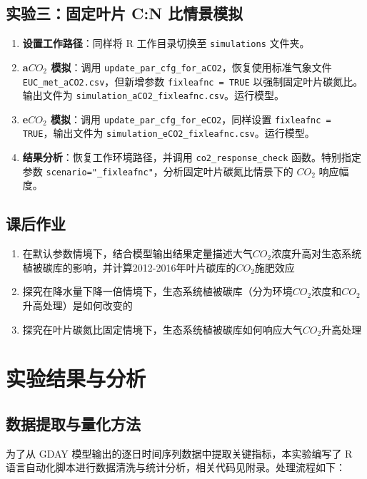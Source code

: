 \documentclass[10pt]{config}
\begin{document}
\subsection{实验三：固定叶片 C:N 比情景模拟}
\begin{enumerate}
    \item \textbf{设置工作路径}：同样将 R 工作目录切换至 \texttt{simulations} 文件夹。
    \item \textbf{a$CO_2$ 模拟}：调用 \texttt{update\_par\_cfg\_for\_aCO2}，恢复使用标准气象文件 \texttt{EUC\_met\_aCO2.csv}，但新增参数 \texttt{fixleafnc = TRUE} 以强制固定叶片碳氮比。输出文件为 \texttt{simulation\_aCO2\_fixleafnc.csv}。运行模型。
    \item \textbf{e$CO_2$ 模拟}：调用 \texttt{update\_par\_cfg\_for\_eCO2}，同样设置 \texttt{fixleafnc = TRUE}，输出文件为 \texttt{simulation\_eCO2\_fixleafnc.csv}。运行模型。
    \item \textbf{结果分析}：恢复工作环境路径，并调用 \texttt{co2\_response\_check} 函数。特别指定参数 \texttt{scenario="\_fixleafnc"}，分析固定叶片碳氮比情景下的 $CO_2$ 响应幅度。
\end{enumerate}

\subsection{课后作业}

\begin{enumerate}
    \item 在默认参数情境下，结合模型输出结果定量描述大气$CO_2$浓度升高对生态系统植被碳库的影响，并计算2012-2016年叶片碳库的$CO_2$施肥效应
    \item 探究在降水量下降一倍情境下，生态系统植被碳库（分为环境$CO_2$浓度和$CO_2$升高处理）是如何改变的
    \item 探究在叶片碳氮比固定情境下，生态系统植被碳库如何响应大气$CO_2$升高处理
\end{enumerate}

\section{实验结果与分析}

\subsection{数据提取与量化方法}

为了从 GDAY 模型输出的逐日时间序列数据中提取关键指标，本实验编写了 R 语言自动化脚本进行数据清洗与统计分析，相关代码见附录。处理流程如下：
\end{document}
